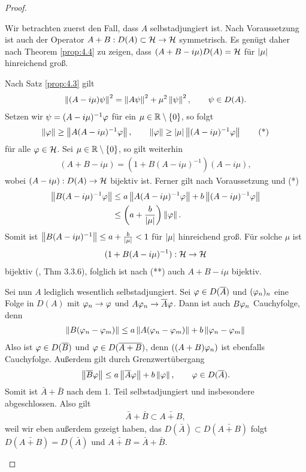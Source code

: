 \begin{proof}
\begin{proofenum}
\item
Wir betrachten zuerst den Fall, dass $A$ selbstadjungiert ist. Nach
Voraussetzung ist auch der Operator
$
A+B:D(A)\subset\mathcal{H}\to \mathcal{H}
$
symmetrisch. Es genügt daher nach Theorem \ref{prop:4.4} 
zu zeigen, dass $(A+B-i\mu)D(A) =\mathcal{H}$ für $\left|\mu\right|$ hinreichend groß.

Nach Satz \ref{prop:4.3} gilt
\begin{align*}
\left\|(A-i\mu)\psi\right\|^2 = \left\|A\psi\right\|^2 + \mu^2\left\|\psi\right\|^2,\qquad \psi\in D(A).
\end{align*}
Setzen wir $\psi=(A-i\mu)^{-1}\varphi$ für ein $\mu\in\mathbb{R}\setminus\left\{ 0 \right\}$, so folgt
\begin{align*}
\left\|\varphi\right\| \ge \left\|A(A-i\mu)^{-1}\varphi\right\|,\qquad
\left\|\varphi\right\| \ge \left|\mu\right|\left\|(A-i\mu)^{-1}\varphi\right\|\tag{*}
\end{align*}
für alle $\varphi\in\mathcal{H}$. Sei $\mu\in\mathbb{R}\setminus \left\{ 0 \right\}$, so gilt weiterhin
\begin{align*}
(A+B-i\mu) = (1+B(A-i\mu)^{-1})(A-i\mu),\tag{**}
\end{align*}
wobei $(A-i\mu):D(A)\to\mathcal{H}$ bijektiv ist. Ferner gilt nach Voraussetzung und (*)
\begin{align*}
\left\|B(A-i\mu)^{-1}\varphi\right\| &\le a \left\|A(A-i\mu)^{-1}\varphi\right\| +
b\left\|(A-i\mu)^{-1}\varphi\right\|\\
&\le \left(a+\frac{b}{\left|\mu\right|}\right)\left\|\varphi\right\|.
\end{align*} 
Somit ist $\left\|B(A-i\mu)^{-1}\right\|\le a+\frac{b}{\left|\mu\right|} < 1$ für
$\left|\mu\right|$ hinreichend groß. Für solche $\mu$ ist
\begin{align*}
(1+B(A-i\mu)^{-1}) : \mathcal{H}\to\mathcal{H}
\end{align*}
bijektiv (\cite{Fun07}, Thm 3.3.6), folglich ist nach (**) auch $A+B-i\mu$
bijektiv.
\item Sei nun $A$ lediglich wesentlich selbstadjungiert. Sei $\varphi\in D(\overline{A})$
und $(\varphi_n)_n$ eine Folge in $D(A)$ mit $\varphi_n\to \varphi$ und $A\varphi_n\to
\overline{A}\varphi$. Dann ist auch $B\varphi_n$ Cauchyfolge, denn
\begin{align*}
\left\|B(\varphi_n-\varphi_m)\right\| \le a\left\|A(\varphi_n-\varphi_m)\right\| + b\left\|\varphi_n-\varphi_m\right\|
\end{align*}
Also ist $\varphi\in D(\overline{B})$ und $\varphi\in D(\overline{A+B})$, denn $((A+B)\varphi_n)$ ist
ebenfalls Cauchyfolge. Außerdem gilt durch Grenzwertübergang
\begin{align*}
\left\|\overline{B}\varphi\right\| \le a\left\|\overline{A}\varphi\right\| + b\left\|\varphi\right\|,\qquad \varphi\in D(\overline{A}).
\end{align*}
Somit ist $\bar{A}+\bar{B}$ nach dem 1. Teil selbstadjungiert und insbesondere
abgeschlossen. Also gilt
\begin{align*}
\bar{A}+\bar{B}\subset \bar{A+B},
\end{align*}
weil wir eben außerdem gezeigt haben, das $D(\bar{A})\subset D(\bar{A+B})$ folgt
$D(\bar{A+B}) = D(\bar{A})$ und $\bar{A+B} = \bar{A}+\bar{B}$.\qedhere
\end{proofenum}
\end{proof}


